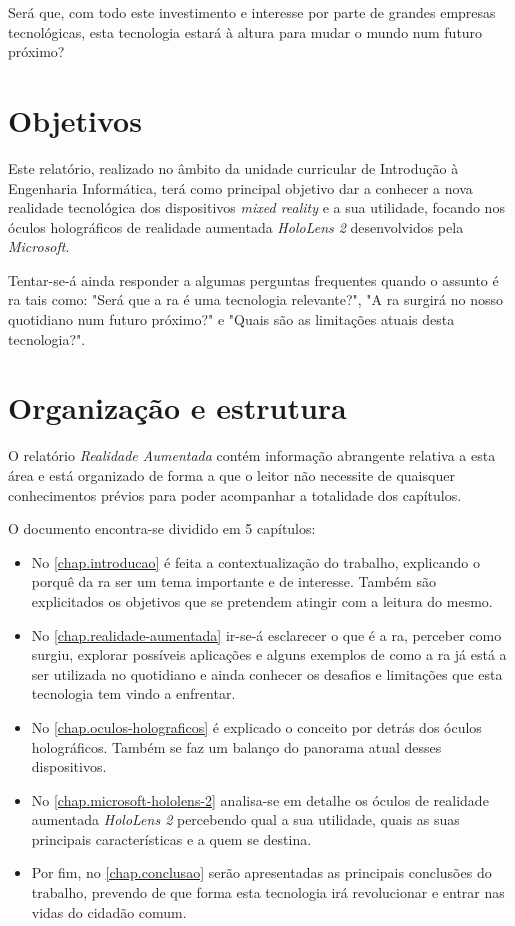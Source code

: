 \documentclass{report}
\begin{document}
Será que, com todo este investimento e interesse por parte de grandes empresas tecnológicas, esta tecnologia estará à altura para mudar o mundo num futuro próximo?

\section{Objetivos}
Este relatório, realizado no âmbito da unidade curricular de Introdução à Engenharia Informática, terá como principal objetivo dar a conhecer a nova realidade tecnológica dos dispositivos \textit{mixed reality} e a sua utilidade, focando nos óculos holográficos de realidade aumentada \textit{HoloLens 2} desenvolvidos pela \textit{Microsoft}.

Tentar-se-á ainda responder a algumas perguntas frequentes quando o assunto é \ac{ra} tais como: "Será que a \ac{ra} é uma tecnologia relevante?", "A \ac{ra} surgirá no nosso quotidiano num futuro próximo?" e "Quais são as limitações atuais desta tecnologia?".

\section{Organização e estrutura}
O relatório \textit{Realidade Aumentada} contém informação abrangente relativa a esta área e está organizado de forma a que o leitor não necessite de quaisquer conhecimentos prévios para poder acompanhar a totalidade dos capítulos.

O documento encontra-se dividido em 5 capítulos:
\begin{itemize}
    \item No \autoref{chap.introducao} é feita a contextualização do trabalho, explicando o porquê da \ac{ra} ser um tema importante e de interesse. Também são explicitados os objetivos que se pretendem atingir com a leitura do mesmo.
    \item No \autoref{chap.realidade-aumentada} ir-se-á esclarecer o que é a \ac{ra}, perceber como surgiu, explorar possíveis aplicações e alguns exemplos de como a \ac{ra} já está a ser utilizada no quotidiano e ainda conhecer os desafios e limitações que esta tecnologia tem vindo a enfrentar.
    \item No \autoref{chap.oculos-holograficos} é explicado o conceito por detrás dos óculos holográficos. Também se faz um balanço do panorama atual desses dispositivos.
    \item No \autoref{chap.microsoft-hololens-2} analisa-se em detalhe os óculos de realidade aumentada \textit{HoloLens 2} percebendo qual a sua utilidade, quais as suas principais características e a quem se destina.
    \item Por fim, no \autoref{chap.conclusao} serão apresentadas as principais conclusões do trabalho, prevendo de que forma esta tecnologia irá revolucionar e entrar nas vidas do cidadão comum.
\end{itemize}
\end{document}
